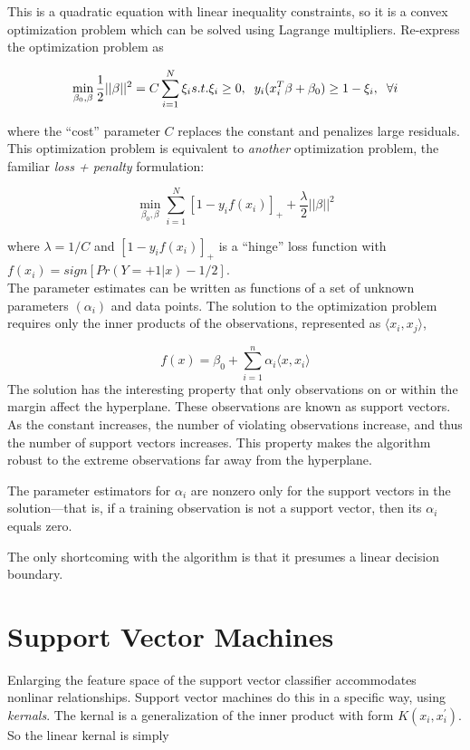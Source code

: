 \documentclass[
]{book}
\begin{document}
This is a quadratic equation with linear inequality constraints, so it is a convex optimization problem which can be solved using Lagrange multipliers. Re-express the optimization problem as

\[
\min_{\beta_0, \beta} \frac{1}{2}||\beta||^2 = C\sum_{i = 1}^N \xi_i \\
s.t. \xi_i \ge 0, \hspace{2mm} y_i(x_i^T\beta + \beta_0) \ge 1 - \xi_i, \hspace{2mm} \forall i
\]

where the ``cost'' parameter \(C\) replaces the constant and penalizes large residuals. This optimization problem is equivalent to \emph{another} optimization problem, the familiar \emph{loss + penalty} formulation:

\[\min_{\beta_0, \beta} \sum_{i=1}^N{[1 - y_if(x_i)]_+} + \frac{\lambda}{2} ||\beta||^2 \]

where \(\lambda = 1 / C\) and \([1 - y_if(x_i)]_+\) is a ``hinge'' loss function with \(f(x_i) = sign[Pr(Y = +1|x) - 1 / 2]\).\\
The parameter estimates can be written as functions of a set of unknown parameters \((\alpha_i)\) and data points. The solution to the optimization problem requires only the inner products of the observations, represented as \(\langle x_i, x_j \rangle\),

\[f(x) = \beta_0 + \sum_{i = 1}^n {\alpha_i \langle x, x_i \rangle}\]
The solution has the interesting property that only observations on or within the margin affect the hyperplane. These observations are known as support vectors. As the constant increases, the number of violating observations increase, and thus the number of support vectors increases. This property makes the algorithm robust to the extreme observations far away from the hyperplane.

The parameter estimators for \(\alpha_i\) are nonzero only for the support vectors in the solution---that is, if a training observation is not a support vector, then its \(\alpha_i\) equals zero.

The only shortcoming with the algorithm is that it presumes a linear decision boundary.

\hypertarget{support-vector-machines-1}{%
\section{Support Vector Machines}\label{support-vector-machines-1}}

Enlarging the feature space of the support vector classifier accommodates nonlinar relationships. Support vector machines do this in a specific way, using \emph{kernals}. The kernal is a generalization of the inner product with form \(K(x_i, x_i^{'})\). So the linear kernal is simply
\end{document}
